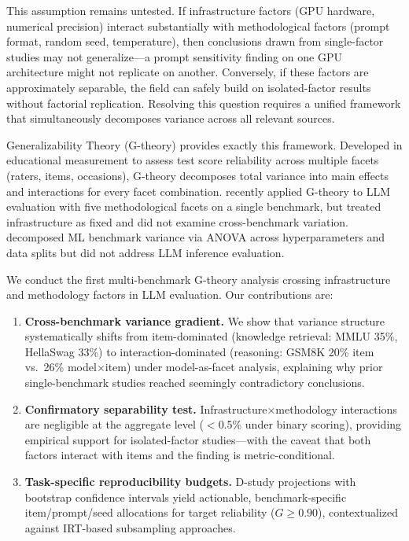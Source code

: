 \documentclass[letterpaper,11pt]{article}
\begin{document}
This assumption remains untested.
If infrastructure factors (GPU hardware, numerical precision) interact substantially with methodological factors (prompt format, random seed, temperature), then conclusions drawn from single-factor studies may not generalize---a prompt sensitivity finding on one GPU architecture might not replicate on another.
Conversely, if these factors are approximately separable, the field can safely build on isolated-factor results without factorial replication.
Resolving this question requires a unified framework that simultaneously decomposes variance across all relevant sources.

Generalizability Theory (G-theory) \citep{shavelson1991generalizability,brennan2001generalizability} provides exactly this framework.
Developed in educational measurement to assess test score reliability across multiple facets (raters, items, occasions), G-theory decomposes total variance into main effects and interactions for every facet combination.
\citet{mesting2026gtheory} recently applied G-theory to LLM evaluation with five methodological facets on a single benchmark, but treated infrastructure as fixed and did not examine cross-benchmark variation.
\citet{bouthillier2021accounting} decomposed ML benchmark variance via ANOVA across hyperparameters and data splits but did not address LLM inference evaluation.

We conduct the first multi-benchmark G-theory analysis crossing infrastructure and methodology factors in LLM evaluation. Our contributions are:
\begin{enumerate}
\item \textbf{Cross-benchmark variance gradient.} We show that variance structure systematically shifts from item-dominated (knowledge retrieval: MMLU 35\%, HellaSwag 33\%) to interaction-dominated (reasoning: GSM8K 20\% item vs.\ 26\% model$\times$item) under model-as-facet analysis, explaining why prior single-benchmark studies reached seemingly contradictory conclusions.
\item \textbf{Confirmatory separability test.} Infrastructure$\times$methodology interactions are negligible at the aggregate level ($<$0.5\% under binary scoring), providing empirical support for isolated-factor studies---with the caveat that both factors interact with items and the finding is metric-conditional.
\item \textbf{Task-specific reproducibility budgets.} D-study projections with bootstrap confidence intervals yield actionable, benchmark-specific item/prompt/seed allocations for target reliability ($G\geq0.90$), contextualized against IRT-based subsampling approaches.
\end{enumerate}
\end{document}
